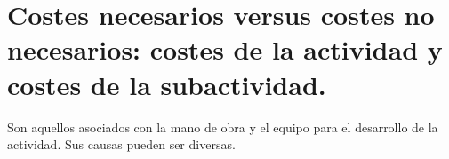 \documentclass[12pt]{book} %
\begin{document}
\hypertarget{costes-necesarios-versus-costes-no-necesarios-costes-de-la-actividad-y-costes-de-la-subactividad.}{%
\section{Costes necesarios versus costes no necesarios: costes de la
actividad y costes de la
subactividad.}\label{costes-necesarios-versus-costes-no-necesarios-costes-de-la-actividad-y-costes-de-la-subactividad.}}

Son aquellos asociados con la mano de obra y el equipo para el
desarrollo de la actividad. Sus causas pueden ser diversas.


\end{document}

